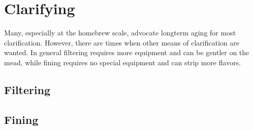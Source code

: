 \section{Clarifying}
 Many, especially at the homebrew scale, advocate longterm aging for most clarification. However, there are times when
 other means of clarification are wanted. In general filtering requires more equipment and can be gentler on the mead,
 while fining requires no special equipment and can strip more flavors.
 \subsection{Filtering}

 \subsection{Fining}